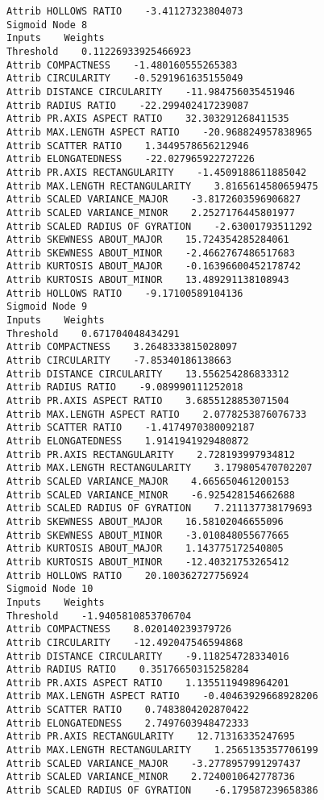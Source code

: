\documentclass[
	article,			%
	11pt,				%
	oneside,			%
	a4paper,			%
	english,			%
	brazil,				%
	sumario=tradicional
	]{abntex2}
\begin{document}
\begin{lstlisting}
Attrib HOLLOWS RATIO    -3.41127323804073
Sigmoid Node 8
Inputs    Weights
Threshold    0.11226933925466923
Attrib COMPACTNESS    -1.480160555265383
Attrib CIRCULARITY    -0.5291961635155049
Attrib DISTANCE CIRCULARITY    -11.984756035451946
Attrib RADIUS RATIO    -22.299402417239087
Attrib PR.AXIS ASPECT RATIO    32.303291268411535
Attrib MAX.LENGTH ASPECT RATIO    -20.968824957838965
Attrib SCATTER RATIO    1.3449578656212946
Attrib ELONGATEDNESS    -22.027965922727226
Attrib PR.AXIS RECTANGULARITY    -1.4509188611885042
Attrib MAX.LENGTH RECTANGULARITY    3.8165614580659475
Attrib SCALED VARIANCE_MAJOR    -3.8172603596906827
Attrib SCALED VARIANCE_MINOR    2.2527176445801977
Attrib SCALED RADIUS OF GYRATION    -2.63001793511292
Attrib SKEWNESS ABOUT_MAJOR    15.724354285284061
Attrib SKEWNESS ABOUT_MINOR    -2.4662767486517683
Attrib KURTOSIS ABOUT_MAJOR    -0.16396600452178742
Attrib KURTOSIS ABOUT_MINOR    13.489291138108943
Attrib HOLLOWS RATIO    -9.17100589104136
Sigmoid Node 9
Inputs    Weights
Threshold    0.671704048434291
Attrib COMPACTNESS    3.2648333815028097
Attrib CIRCULARITY    -7.85340186138663
Attrib DISTANCE CIRCULARITY    13.556254286833312
Attrib RADIUS RATIO    -9.089990111252018
Attrib PR.AXIS ASPECT RATIO    3.6855128853071504
Attrib MAX.LENGTH ASPECT RATIO    2.0778253876076733
Attrib SCATTER RATIO    -1.4174970380092187
Attrib ELONGATEDNESS    1.9141941929480872
Attrib PR.AXIS RECTANGULARITY    2.728193997934812
Attrib MAX.LENGTH RECTANGULARITY    3.179805470702207
Attrib SCALED VARIANCE_MAJOR    4.665650461200153
Attrib SCALED VARIANCE_MINOR    -6.925428154662688
Attrib SCALED RADIUS OF GYRATION    7.211137738179693
Attrib SKEWNESS ABOUT_MAJOR    16.58102046655096
Attrib SKEWNESS ABOUT_MINOR    -3.010848055677665
Attrib KURTOSIS ABOUT_MAJOR    1.143775172540805
Attrib KURTOSIS ABOUT_MINOR    -12.40321753265412
Attrib HOLLOWS RATIO    20.100362727756924
Sigmoid Node 10
Inputs    Weights
Threshold    -1.9405810853706704
Attrib COMPACTNESS    8.020140239379726
Attrib CIRCULARITY    -12.492047546594868
Attrib DISTANCE CIRCULARITY    -9.118254728334016
Attrib RADIUS RATIO    0.35176650315258284
Attrib PR.AXIS ASPECT RATIO    1.1355119498964201
Attrib MAX.LENGTH ASPECT RATIO    -0.40463929668928206
Attrib SCATTER RATIO    0.7483804202870422
Attrib ELONGATEDNESS    2.7497603948472333
Attrib PR.AXIS RECTANGULARITY    12.71316335247695
Attrib MAX.LENGTH RECTANGULARITY    1.2565135357706199
Attrib SCALED VARIANCE_MAJOR    -3.2778957991297437
Attrib SCALED VARIANCE_MINOR    2.7240010642778736
Attrib SCALED RADIUS OF GYRATION    -6.179587239658386

\end{lstlisting}
\end{document}
